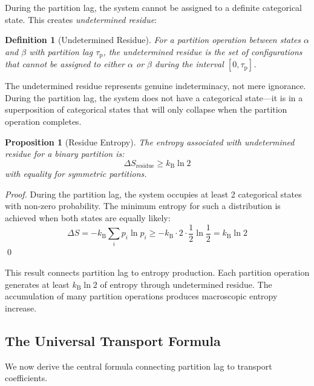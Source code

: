 \documentclass[twocolumn,10pt,aps,prd,superscriptaddress,nofootinbib]{revtex4-2}
\newtheorem{proposition}[theorem]{Proposition}
\newtheorem{definition}[theorem]{Definition}
\theoremstyle{remark}
\newcommand{\kB}{k_{\mathrm{B}}}
\newcommand{\tauP}{\tau_{\mathrm{p}}}
\begin{document}
During the partition lag, the system cannot be assigned to a definite categorical state. This creates \emph{undetermined residue}:

\begin{definition}[Undetermined Residue]
\label{def:residue}
For a partition operation between states $\alpha$ and $\beta$ with partition lag $\tauP$, the undetermined residue is the set of configurations that cannot be assigned to either $\alpha$ or $\beta$ during the interval $[0, \tauP]$.
\end{definition}

The undetermined residue represents genuine indeterminacy, not mere ignorance. During the partition lag, the system does not have a categorical state---it is in a superposition of categorical states that will only collapse when the partition operation completes.

\begin{proposition}[Residue Entropy]
\label{prop:residue_entropy}
The entropy associated with undetermined residue for a binary partition is:
\begin{equation}
\Delta S_{\text{residue}} \geq \kB \ln 2
\label{eq:residue_entropy}
\end{equation}
with equality for symmetric partitions.
\end{proposition}

\begin{proof}
During the partition lag, the system occupies at least 2 categorical states with non-zero probability. The minimum entropy for such a distribution is achieved when both states are equally likely:
\begin{equation}
\Delta S = -\kB \sum_i p_i \ln p_i \geq -\kB \cdot 2 \cdot \frac{1}{2} \ln \frac{1}{2} = \kB \ln 2
\end{equation}
\qed
\end{proof}

This result connects partition lag to entropy production. Each partition operation generates at least $\kB \ln 2$ of entropy through undetermined residue. The accumulation of many partition operations produces macroscopic entropy increase.

\subsection{The Universal Transport Formula}

We now derive the central formula connecting partition lag to transport coefficients.
\end{document}

